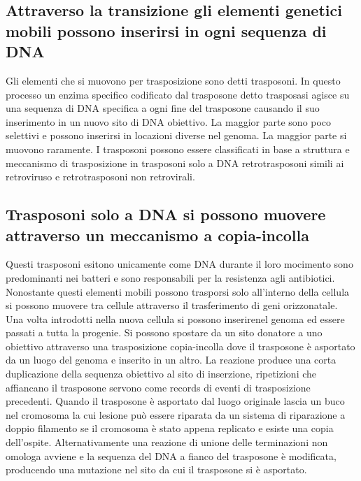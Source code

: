 \subsection{Attraverso la transizione gli elementi genetici mobili possono inserirsi in ogni sequenza di DNA}
Gli elementi che si muovono per trasposizione sono detti trasposoni. In questo processo un enzima specifico codificato dal trasposone detto trasposasi agisce su una sequenza di DNA
specifica a ogni fine del trasposone causando il suo inserimento in un nuovo sito di DNA obiettivo. La maggior parte sono poco selettivi e possono inserirsi in locazioni diverse nel
genoma. La maggior parte si muovono raramente. I trasposoni possono essere classificati in base a struttura e meccanismo di trasposizione in trasposoni solo a DNA retrotrasposoni simili
ai retroviruso e retrotrasposoni non retrovirali. 
\subsection{Trasposoni solo a DNA si possono muovere attraverso un meccanismo a copia-incolla}
Questi trasposoni esitono unicamente come DNA durante il loro mocimento sono predominanti nei batteri e sono responsabili per la resistenza agli antibiotici. Nonostante questi elementi
mobili possono trasporsi solo all'interno della cellula si possono muovere tra cellule attraverso il trasferimento di geni orizzonatale. Una volta introdotti nella nuova cellula si 
possono inserirenel genoma ed essere passati a tutta la progenie. Si possono spostare da un sito donatore a uno obiettivo attraverso una trasposizione copia-incolla dove il trasposone 
\`e asportato da un luogo del genoma e inserito in un altro. La reazione produce una corta duplicazione della sequenza obiettivo al sito di inserzione, ripetizioni che affiancano il 
trasposone servono come records di eventi di trasposizione precedenti. Quando il trasposone \`e asportato dal luogo originale lascia un buco nel cromosoma la cui lesione pu\`o essere
riparata da un sistema di riparazione a doppio filamento se il cromosoma \`e stato appena replicato e esiste una copia dell'ospite. Alternativamente una reazione di unione delle 
terminazioni non omologa avviene e la sequenza del DNA a fianco del trasposone \`e modificata, producendo una mutazione nel sito da cui il trasposone si \`e asportato. 
